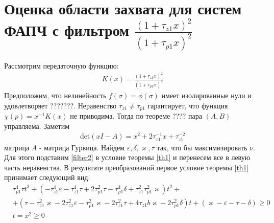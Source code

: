 \documentclass[a4paper,14pt]{extarticle} %
\begin{document}
\newpage
\section{Оценка области захвата для систем ФАПЧ с фильтром $\frac{(1+\tau_{z1}x)^2}{(1+\tau_{p1}x)^2}$}
 Рассмотрим передаточную функцию:
 \begin{equation}\label{filter2}
 \begin{aligned}
K(x) = \frac{(1+\tau_{z1}x)^2}{(1+\tau_{p1}x)^2}
 \end{aligned}
\end{equation}
Предположим, что нелинейность $f(\sigma)=\phi(\sigma)$ имеет изолированные нули и удовлетворяет ???????.
Неравенство $\tau_{z1} \neq \tau_{p1}$ гарантирует, что функция $\chi(p) = x^{-1}K(x)$ не приводима. Тогда по теореме ???? пара $(A,B)$ управляема. Заметим
 \begin{equation}
 \begin{aligned}
\text{det}(xI-A) = x^2 + 2\tau_{z1}^{-1}x + \tau_{z1}^{-2}
 \end{aligned}
\end{equation}
матрица $A$ - матрица Гурвица. Найдем $\varepsilon, \delta, \varkappa, \tau$ так, что бы максимизировать $\nu$. Для этого подставим \eqref{filter2} в условие теоремы \ref{th1} и перенесем все в левую часть неравенства. В результате преобразований первое условие теоремы \ref{th1} принимает следующий вид:
 \begin{equation}\label{second_condition}
 \begin{aligned}
&\tau_{p1}^4\tau t^3 +(- \tau_{z1}^4\varepsilon - \tau_{z1}^4\tau + 2\tau_{p1}^2\tau- \tau_{p1}^4\delta + \tau_{z1}^2\tau_{p1}^2\varkappa)t^2  +\\
&+( \tau- \tau_{z1}^2\varkappa - 2\tau_{z1}^2\varepsilon - \tau_{p1}^2\varkappa- 2\tau_{z1}^2\tau+ 4\tau_{z1}b\varkappa- 2\tau_{p1}^2\delta)t + (\varkappa-\varepsilon - \tau - \delta)  \geq 0\\
&t = x^2 \geq 0
 \end{aligned}
\end{equation}
\end{document}
